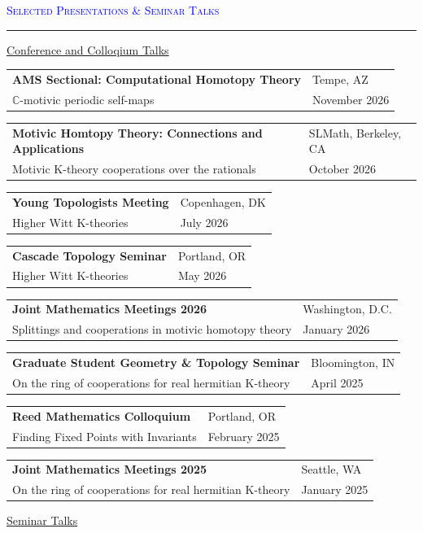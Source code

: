 \documentclass[10pt]{article}
\makeatletter
\newcommand{\grey}[1]{\textcolor{cvgrey}{#1}}
\newcommand{\altarray}[1]{
    \begin{tabular}{>{\raggedright\arraybackslash}p{13cm} @{\hskip 1cm} >{\raggedleft\arraybackslash}p{3.25cm}}
    #1
    \end{tabular}
}
\newenvironment{rSection}[1]{ %
  \medskip
  {\large\scshape\textcolor{Blue}{#1}} %
  \smallskip
  \hrule %
  \begin{list}{}{ %
    \setlength{\leftmargin}{0em} %
  }
  \item[]
}{
  \end{list}
}
\makeatother
\begin{document}
\begin{rSection}{Selected Presentations \& Seminar Talks}

\underline{Conference and Colloqium Talks}

\altarray{
    \textbf{AMS Sectional: Computational Homotopy Theory} & \footnotesize Tempe, AZ\\
    \grey{$\mathbb{C}$-motivic periodic self-maps} & \footnotesize \grey{November 2026}
}
\altarray{
    \textbf{Motivic Homtopy Theory: Connections and Applications} & \footnotesize SLMath, Berkeley, CA\\
    \grey{Motivic K-theory cooperations over the rationals} & \footnotesize \grey{October 2026}
}
\altarray{
    \textbf{Young Topologists Meeting} & \footnotesize Copenhagen, DK\\
    \grey{Higher Witt K-theories} & \footnotesize \grey{July 2026}
}
\altarray{
    \textbf{Cascade Topology Seminar} & \footnotesize Portland, OR\\
    \grey{Higher Witt K-theories} & \footnotesize \grey{May 2026}
}
\altarray{
    \textbf{Joint Mathematics Meetings 2026} & \footnotesize Washington, D.C.\\
    \grey{Splittings and cooperations in motivic homotopy theory} & \footnotesize \grey{January 2026}
}
\altarray{
    \textbf{Graduate Student Geometry \& Topology Seminar} & \footnotesize Bloomington, IN \\
    \grey{On the ring of cooperations for real hermitian K-theory} & \footnotesize \grey{April 2025}
}
\altarray{
    \textbf{Reed Mathematics Colloquium} & \footnotesize Portland, OR\\
    \grey{Finding Fixed Points with Invariants}
     & \footnotesize \grey{February 2025}
}
\altarray{
    \textbf{Joint Mathematics Meetings 2025} & \footnotesize Seattle, WA \\
    \grey{On the ring of cooperations for real hermitian K-theory} & \footnotesize \grey{January 2025}
}

\underline{Seminar Talks}


\end{rSection}
\end{document}
